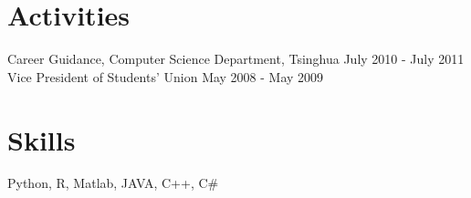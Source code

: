 \documentclass[margin, 10pt]{res} %
\begin{document}
\begin{resume}

\section{Activities}

Career Guidance, Computer Science Department, Tsinghua \hfill {July 2010 - July 2011} \\
Vice President of Students' Union \hfill {May 2008 - May 2009}


\section{Skills}

Python, R, Matlab, JAVA, C++, C\# \\

\end{resume}
\end{document}
